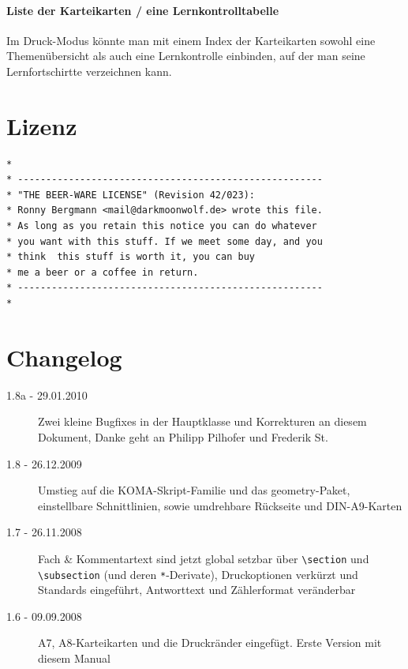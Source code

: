 \documentclass[a4paper,DIV=calc]{scrartcl}
\begin{document}
\paragraph{Liste der Karteikarten / eine Lernkontrolltabelle} 
Im Druck-Modus könnte man mit einem Index der Karteikarten sowohl eine Themenübersicht als auch eine Lernkontrolle einbinden, auf der man seine Lernfortschirtte verzeichnen kann.
\section{Lizenz}
\begin{lstlisting}[basicstyle=\sffamily, numbers=none]
*
* ------------------------------------------------------
* "THE BEER-WARE LICENSE" (Revision 42/023):
* Ronny Bergmann <mail@darkmoonwolf.de> wrote this file.
* As long as you retain this notice you can do whatever
* you want with this stuff. If we meet some day, and you
* think  this stuff is worth it, you can buy
* me a beer or a coffee in return. 
* ------------------------------------------------------
*
\end{lstlisting}
\section{Changelog}
\begin{description}
	\item[1.8a - 29.01.2010] Zwei kleine Bugfixes in der Hauptklasse und Korrekturen an diesem Dokument, Danke geht an Philipp Pilhofer und Frederik St.
	\item[1.8 - 26.12.2009] Umstieg auf die KOMA-Skript-Familie und das geometry-Paket, einstellbare Schnittlinien, sowie umdrehbare Rückseite und DIN-A9-Karten
	\item[1.7 - 26.11.2008] Fach \& Kommentartext sind jetzt global setzbar über \lstinline!\section! und \lstinline!\subsection! (und deren \lstinline!*!-Derivate), Druckoptionen verkürzt und Standards eingeführt, Antworttext und Zählerformat veränderbar
	\item[1.6 - 09.09.2008] A7, A8-Karteikarten und die Druckränder eingefügt. Erste Version mit diesem Manual
\end{description}
\end{document}
